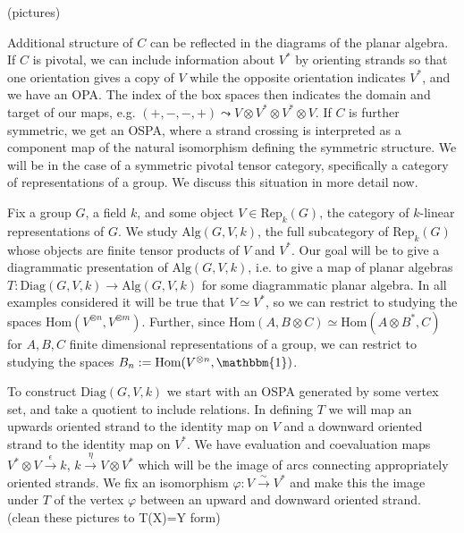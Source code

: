 \documentclass[11pt]{article} %
\begin{document}
(pictures)

Additional structure of $C$ can be reflected in the diagrams of the planar algebra. If $C$ is pivotal, we can include information about $V^*$ by orienting strands so that one orientation gives a copy of $V$ while the opposite orientation indicates $V^*$, and we have an OPA. The index of the box spaces then indicates the domain and target of our maps, e.g. $(+,-,-,+) \leadsto V \otimes V^* \otimes V^* \otimes V$. If $C$ is further symmetric, we get an OSPA, where a strand crossing is interpreted as a component map of the natural isomorphism defining the symmetric structure. We will be in the case of a symmetric pivotal tensor category, specifically a category of representations of a group. We discuss this situation in more detail now.

Fix a group $G$, a field $k$, and some object $V\in \text{Rep}_k(G)$, the category of $k$-linear representations of $G$. We study $\text{Alg}(G,V,k)$, the full subcategory of $\text{Rep}_k(G)$ whose objects are finite tensor products of $V$ and $V^{\ast}$. Our goal will be to give a diagrammatic presentation of $\text{Alg}(G,V,k)$, i.e. to give a map of planar algebras $T:\text{Diag}(G,V,k) \rightarrow \text{Alg}(G,V,k)$ for some diagrammatic planar algebra. In all examples considered it will be true that $V \simeq V^{\ast}$, so we can restrict to studying the spaces $\text{Hom}(V^{\otimes n},V^{\otimes m})$. Further, since $\text{Hom}(A, B \otimes C) \simeq \text{Hom}(A\otimes B^{\ast},C)$ for $A,B,C$ finite dimensional representations of a group, we can restrict to studying the spaces $B_n := \text{Hom}(V^{\otimes n}, \mathbbm{1})$.

To construct $\text{Diag}(G,V,k)$ we start with an OSPA generated by some vertex set, and take a quotient to include relations. In defining $T$ we will map an upwards oriented strand to the identity map on $V$ and a downward oriented strand to the identity map on $V^{\ast}$. We have evaluation and coevaluation maps $V^{\ast} \otimes V \xrightarrow{\epsilon} k$, $k \xrightarrow{\eta} V \otimes V^{\ast}$ which will be the image of arcs connecting appropriately oriented strands. We fix an isomorphism $\varphi:V \xrightarrow{\sim} V^{\ast}$ and make this the image under $T$ of the vertex $\varphi$ between an upward and downward oriented strand. (clean these pictures to T(X)=Y form)
\end{document}

